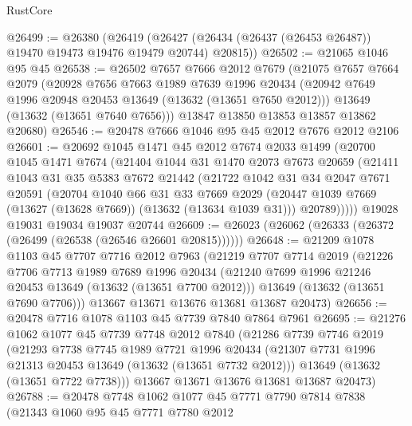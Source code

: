 \begin{lexlean}{RustCore}
\begin{coremodule}
@26499 := @26380
    (@26419 (@26427 (@26434 (@26437 (@26453 @26487)) @19470 @19473 @19476 @19479 @20744) @20815))
@26502 := @21065 @1046 @95 @45
@26538 := @26502
    @7657
    @7666
    @2012
    @7679
    (@21075
      @7657
      @7664
      @2079
      (@20928
        @7656
        @7663
        @1989
        @7639
        @1996
        @20434
        (@20942 @7649 @1996 @20948 @20453 @13649 (@13632 (@13651 @7650 @2012)))
        @13649
        (@13632 (@13651 @7640 @7656)))
      @13847
      @13850
      @13853
      @13857
      @13862
      @20680)
@26546 := @20478 @7666 @1046 @95 @45 @2012 @7676 @2012 @2106
@26601 := @20692
    @1045
    @1471
    @45
    @2012
    @7674
    @2033
    @1499
    (@20700
      @1045
      @1471
      @7674
      (@21404
        @1044
        @31
        @1470
        @2073
        @7673
        @20659
        (@21411
          @1043
          @31
          @35
          @5383
          @7672
          @21442
          (@21722
            @1042
            @31
            @34
            @2047
            @7671
            @20591
            (@20704
              @1040
              @66
              @31
              @33
              @7669
              @2029
              (@20447 @1039 @7669 (@13627 (@13628 @7669)) (@13632 (@13634 @1039 @31)))
              @20789)))))
    @19028
    @19031
    @19034
    @19037
    @20744
@26609 := @26023 (@26062 (@26333 (@26372 (@26499 (@26538 (@26546 @26601 @20815))))))
@26648 := @21209
    @1078
    @1103
    @45
    @7707
    @7716
    @2012
    @7963
    (@21219
      @7707
      @7714
      @2019
      (@21226
        @7706
        @7713
        @1989
        @7689
        @1996
        @20434
        (@21240 @7699 @1996 @21246 @20453 @13649 (@13632 (@13651 @7700 @2012)))
        @13649
        (@13632 (@13651 @7690 @7706)))
      @13667
      @13671
      @13676
      @13681
      @13687
      @20473)
@26656 := @20478 @7716 @1078 @1103 @45 @7739 @7840 @7864 @7961
@26695 := @21276
    @1062
    @1077
    @45
    @7739
    @7748
    @2012
    @7840
    (@21286
      @7739
      @7746
      @2019
      (@21293
        @7738
        @7745
        @1989
        @7721
        @1996
        @20434
        (@21307 @7731 @1996 @21313 @20453 @13649 (@13632 (@13651 @7732 @2012)))
        @13649
        (@13632 (@13651 @7722 @7738)))
      @13667
      @13671
      @13676
      @13681
      @13687
      @20473)
@26788 := @20478
    @7748
    @1062
    @1077
    @45
    @7771
    @7790
    @7814
    @7838
    (@21343
      @1060
      @95
      @45
      @7771
      @7780
      @2012

\end{coremodule}
\end{lexlean}
